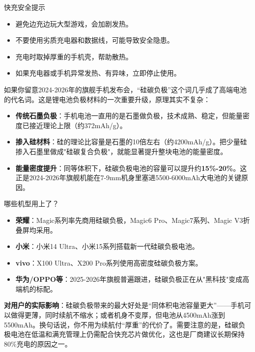 \begin{tcbwarn}{快充安全提示}
\begin{itemize}
  \item 避免边充边玩大型游戏，会加剧发热。
  \item 不要使用劣质充电器和数据线，可能导致安全隐患。
  \item 充电时取掉厚重的手机壳，帮助散热。
  \item 如果充电器或手机异常发热、有异味，立即停止使用。
\end{itemize}

\end{tcbwarn}


如果你留意2024-2026年的旗舰手机发布会，“硅碳负极”这个词几乎成了高端电池的代名词。这是锂电池负极材料的一次重要升级，原理其实不复杂：

\begin{itemize}
  \item \textbf{传统石墨负极}：手机电池一直用的是石墨做负极，技术成熟、稳定，但能量密度已接近理论上限（约372mAh/g）。
  \item \textbf{掺入硅材料}：硅的理论比容量是石墨的10倍左右（约4200mAh/g）。把少量硅掺入石墨里做成"硅碳复合负极"，就能显著提升整块电池的能量密度。
  \item \textbf{能量密度提升}：同等体积下，硅碳负极电池的容量可以提升约\textbf{15\%-20\%}。这正是2024-2026年旗舰机能在7-9mm机身里塞进5500-6000mAh大电池的关键原因。
\end{itemize}

\begin{tcbinfo}{哪些机型用上了？}
\begin{itemize}
  \item \textbf{荣耀}：Magic系列率先商用硅碳负极，Magic6 Pro、Magic7系列、Magic V3折叠屏均采用。
  \item \textbf{小米}：小米14 Ultra、小米15系列搭载新一代硅碳负极电池。
  \item \textbf{vivo}：X100 Ultra、X200 Pro系列使用高密度硅碳负极方案。
  \item \textbf{华为/OPPO等}：2025-2026年旗舰普遍跟进，硅碳负极正在从"黑科技"变成高端机的标配。
\end{itemize}

\end{tcbinfo}

\textbf{对用户的实际影响}：硅碳负极带来的最大好处是“同体积电池容量更大”——手机可以做得更薄，同时续航不缩水；或者机身不变厚，但电池从4500mAh涨到5500mAh。换句话说，你不用为续航付“厚重”的代价了。需要注意的是，硅碳负极电池在低温和满充管理上仍需配合快充芯片做优化，这也是厂商建议长期保持80\%充电的原因之一。

